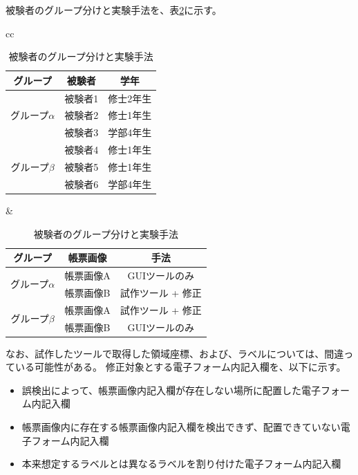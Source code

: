 被験者のグループ分けと実験手法を、表\ref{tb:experiment_case}に示す。
\begin{table}[tp]
	\centering
	\caption{被験者のグループ分けと実験手法}
    \label{tb:experiment_case}
    \begin{tabular}{cc}
        \begin{minipage}[c]{0.45\hsize}
            \centering
            \begin{tabular}{c|c|c}
                グループ & 被験者 & 学年\\
                \hline \hline
                \multirow{3}{*}{グループ$\alpha$} & 被験者1 & 修士2年生\\
                                               & 被験者2 & 修士1年生\\
                                               & 被験者3 & 学部4年生\\
                                        \hline
                \multirow{3}{*}{グループ$\beta$} & 被験者4 & 修士1年生\\
                                              & 被験者5 & 修士1年生\\
                                              & 被験者6 & 学部4年生
	        \end{tabular}
        \end{minipage} &
        \begin{minipage}[c]{0.45\hsize}
            \centering
            \begin{tabular}{c|c|c}
                グループ & 帳票画像 & 手法 \\
                \hline \hline
                \multirow{2}{*}{グループ$\alpha$} & 帳票画像A & GUIツールのみ \\
                                               & 帳票画像B & 試作ツール + 修正 \\
                                        \hline
                \multirow{2}{*}{グループ$\beta$} & 帳票画像A & 試作ツール + 修正 \\
                                              & 帳票画像B & GUIツールのみ
            \end{tabular}
        \end{minipage}
    \end{tabular}
\end{table}
なお、試作したツールで取得した領域座標、および、ラベルについては、間違っている可能性がある。
修正対象とする電子フォーム内記入欄を、以下に示す。

\begin{itemize}
    \item 誤検出によって、帳票画像内記入欄が存在しない場所に配置した電子フォーム内記入欄
    \item 帳票画像内に存在する帳票画像内記入欄を検出できず、配置できていない電子フォーム内記入欄
    \item 本来想定するラベルとは異なるラベルを割り付けた電子フォーム内記入欄
\end{itemize}

